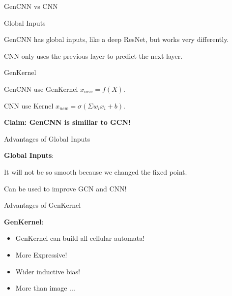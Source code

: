 \documentclass[serif]{beamer}
\begin{document}
\begin{frame}{GenCNN vs CNN}


    \begin{block}{Global Inputs}

        GenCNN has global inputs, like a deep ResNet, but works very differently.

        CNN only uses the previous layer to predict the next layer.

	\end{block}

    \begin{block}{GenKernel}

        GenCNN use GenKernel $x_{new} = f(X)$.
    
        CNN use Kernel $x_{new} = \sigma(\Sigma w_ix_i + b)$.

	\end{block}

	\textbf{Claim: GenCNN is similiar to GCN!}

\end{frame}

\begin{frame}{Advantages of Global Inputs }

	\textbf{Global Inputs}:

	It will not be so smooth because we changed the fixed point.

	Can be used to improve GCN and CNN!

\end{frame}

\begin{frame}{Advantages of GenKernel}

	\textbf{GenKernel}:

	\begin {itemize}

	\item GenKernel can build all cellular automata!

	\item More Expressive!

	\item Wider inductive bias!

	\item More than image ...

	\end {itemize}


\end{frame}
\end{document}
